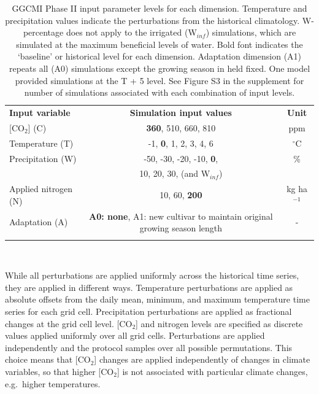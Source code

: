 \documentclass[gmd, manuscript]{copernicus} %
\begin{document}
\begin{table}[t]
\caption{GGCMI Phase II input parameter levels for each dimension. Temperature and precipitation values indicate the perturbations from the historical climatology. W-percentage does not apply to the irrigated (W$_{inf}$) simulations, which are simulated at the maximum beneficial levels of water. Bold font indicates the `baseline' or historical level for each dimension. Adaptation dimension (A1) repeats all (A0) simulations except the growing season in held fixed. One model provided simulations at the T + 5 level. See Figure S3 in the supplement for number of simulations associated with each combination of input levels.}
\label{table:inputs} 
    \begin{tabular}{lcc} 
        \tophline \vspace{1mm}
        \textbf{Input variable} & \textbf{Simulation input values} & \textbf{Unit} \\ \middlehline \vspace{1mm}
        [CO$_2$] (C) & \textbf{360}, 510, 660, 810 & ppm\\ \middlehline \vspace{1mm}
        Temperature (T) & -1, \textbf{0}, 1, 2, 3, 4, 6 & $^{\circ}$C\\ \middlehline \vspace{1mm}
        Precipitation (W) & -50, -30, -20, -10, \textbf{0}, & \% \\
        {} & 10, 20, 30, (and W$_{inf}$) & {} \\ \middlehline \vspace{1mm}
        Applied nitrogen (N) & 10, 60, \textbf{200} & kg ha$^{-1}$ \\ \middlehline \vspace{1mm}
        Adaptation (A) & \textbf{A0: none}, A1: new cultivar to maintain original growing season length & -\\ \bottomhline
    \end{tabular}\\
\end{table}

While all perturbations are applied uniformly across the historical time series, they are applied in different ways. Temperature perturbations are applied as absolute offsets from the daily mean, minimum, and maximum temperature time series for each grid cell.
Precipitation perturbations are applied as fractional changes at the grid cell level. [CO$_2$] and nitrogen levels are specified as discrete values applied uniformly over all grid cells. 
Perturbations are applied independently and the protocol samples over all possible permutations. This choice means that [CO$_2$] changes are applied independently of changes in climate variables, so that higher [CO$_2$] is not associated with particular climate changes, e.g.\ higher temperatures. 
\end{document}
